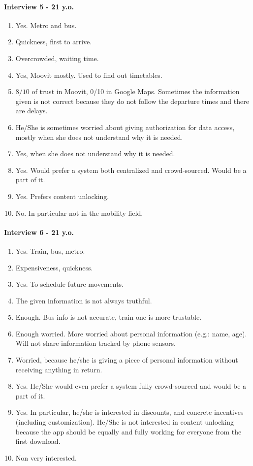 \documentclass[a4paper, 10pt]{article}
\begin{document}
\paragraph*{Interview 5 - 21 y.o.}
\begin{enumerate}
    \item Yes. Metro and bus.
    \item Quickness, first to arrive.
    \item Overcrowded, waiting time.
    \item Yes, Moovit mostly. Used to find out timetables.
    \item $8/10$ of trust in Moovit, 0/10 in Google Maps. Sometimes the information given is not correct because they do not follow the departure times and there are delays.
    \item He/She is sometimes worried about giving authorization for data access, mostly when she does not understand why it is needed.
    \item Yes, when she does not understand why it is needed.
    \item Yes. Would prefer a system both centralized and crowd-sourced. Would be a part of it.
    \item Yes. Prefers content unlocking.
    \item No. In particular not in the mobility field.
\end{enumerate}


\paragraph*{Interview 6 - 21 y.o.}
\begin{enumerate}
    \item Yes. Train, bus, metro.
    \item Expensiveness, quickness.
    \item Yes. To schedule future movements.
    \item The given information is not always truthful.
    \item Enough. Bus info is not accurate, train one is more trustable.
    \item Enough worried. More worried about personal information (e.g.: name, age). Will not share information tracked by phone sensors.
    \item Worried, because he/she is giving a piece of personal information without receiving anything in return.
    \item Yes. He/She would even prefer a system fully crowd-sourced and would be a part of it.
    \item Yes. In particular, he/she is interested in discounts, and concrete incentives (including customization). He/She is not interested in content unlocking because the app should be equally and fully working for everyone from the first download.
    \item Non very interested.
\end{enumerate}
\end{document}
